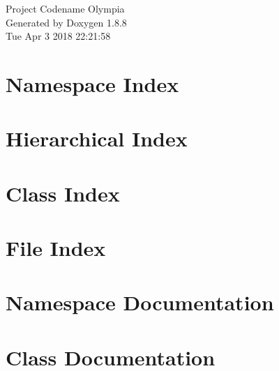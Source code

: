 \documentclass[twoside]{book}
\newcommand{\+}{\discretionary{\mbox{\scriptsize$\hookleftarrow$}}{}{}}
\newcommand{\clearemptydoublepage}{%
  \newpage{\pagestyle{empty}\cleardoublepage}%
}
\begin{document}
\hypersetup{pageanchor=false,
             bookmarks=true,
             bookmarksnumbered=true,
             pdfencoding=unicode
            }
\begin{titlepage}
\vspace*{7cm}
\begin{center}%
{\Large Project Codename Olympia }\\
\vspace*{1cm}
{\large Generated by Doxygen 1.8.8}\\
\vspace*{0.5cm}
{\small Tue Apr 3 2018 22:21:58}\\
\end{center}
\end{titlepage}
\clearemptydoublepage
\tableofcontents
\clearemptydoublepage
{}
\hypersetup{pageanchor=true}

\chapter{Namespace Index}

\chapter{Hierarchical Index}

\chapter{Class Index}

\chapter{File Index}

\chapter{Namespace Documentation}

\chapter{Class Documentation}





















\end{document}
